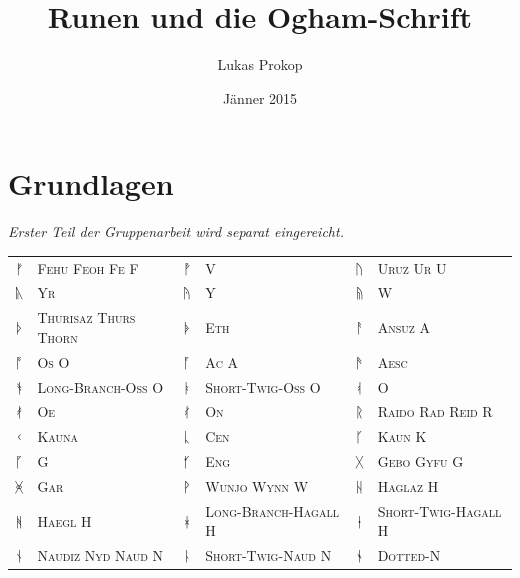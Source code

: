 \documentclass[a4paper]{scrartcl}
\author{Lukas Prokop}
\title{Runen und die Ogham-Schrift}
\date{Jänner 2015}
\begin{document}
\maketitle
\tableofcontents

\section{Grundlagen}

\emph{Erster Teil der Gruppenarbeit wird separat eingereicht.}

\begin{table}[p]
  \small
  \begin{center}
    \begin{tabular}{clclcl}
      {\runicfont ᚠ} & \textsc{Fehu Feoh Fe F} &
      {\runicfont ᚡ} & \textsc{V} &
      {\runicfont ᚢ} & \textsc{Uruz Ur U} \\
      {\runicfont ᚣ} & \textsc{Yr} &
      {\runicfont ᚤ} & \textsc{Y} &
      {\runicfont ᚥ} & \textsc{W} \\
      {\runicfont ᚦ} & \textsc{Thurisaz Thurs Thorn} &
      {\runicfont ᚧ} & \textsc{Eth} &
      {\runicfont ᚨ} & \textsc{Ansuz A} \\
      {\runicfont ᚩ} & \textsc{Os O} &
      {\runicfont ᚪ} & \textsc{Ac A} &
      {\runicfont ᚫ} & \textsc{Aesc} \\
      {\runicfont ᚬ} & \textsc{Long-Branch-Oss O} &
      {\runicfont ᚭ} & \textsc{Short-Twig-Oss O} &
      {\runicfont ᚮ} & \textsc{O} \\
      {\runicfont ᚯ} & \textsc{Oe} &
      {\runicfont ᚰ} & \textsc{On} &
      {\runicfont ᚱ} & \textsc{Raido Rad Reid R} \\
      {\runicfont ᚲ} & \textsc{Kauna} &
      {\runicfont ᚳ} & \textsc{Cen} &
      {\runicfont ᚴ} & \textsc{Kaun K} \\
      {\runicfont ᚵ} & \textsc{G} &
      {\runicfont ᚶ} & \textsc{Eng} &
      {\runicfont ᚷ} & \textsc{Gebo Gyfu G} \\
      {\runicfont ᚸ} & \textsc{Gar} &
      {\runicfont ᚹ} & \textsc{Wunjo Wynn W} &
      {\runicfont ᚺ} & \textsc{Haglaz H} \\
      {\runicfont ᚻ} & \textsc{Haegl H} &
      {\runicfont ᚼ} & \textsc{Long-Branch-Hagall H} &
      {\runicfont ᚽ} & \textsc{Short-Twig-Hagall H} \\
      {\runicfont ᚾ} & \textsc{Naudiz Nyd Naud N} &
      {\runicfont ᚿ} & \textsc{Short-Twig-Naud N} &
      {\runicfont ᛀ} & \textsc{Dotted-N} \\

\end{tabular}
\end{center}
\end{table}
\end{document}
